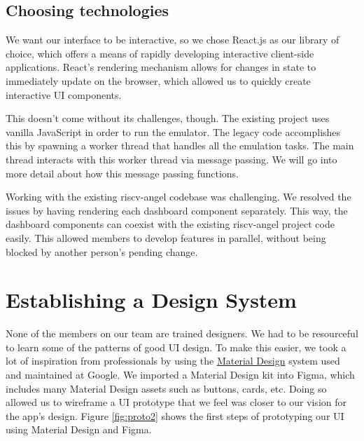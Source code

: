 \subsection*{Choosing technologies}

We want our interface to be interactive, so we chose React.js as our library of choice,
which offers a means of rapidly developing interactive client-side applications. React's
rendering mechanism allows for changes in state to immediately update on the browser,
which allowed us to quickly create interactive UI components.

This doesn't come without its challenges, though. The existing project uses vanilla JavaScript
in order to run the emulator. The legacy code accomplishes this by spawning a worker thread
that handles all the emulation tasks. The main thread interacts with this worker thread via
message passing. We will go into more detail about how this message passing functions.

Working with the existing riscv-angel codebase was challenging. We resolved
the issues by having rendering each dashboard component separately. This way,
the dashboard components can coexist with the existing riscv-angel project code
easily. This allowed members to develop features in parallel, without being blocked
by another person's pending change.


\section{Establishing a Design System}

None of the members on our team are trained designers. We had to be resourceful
to learn some of the patterns of good UI design. To make this easier, we took
a lot of inspiration from professionals by using the \href{https://material.io/design}{Material Design}
system used and maintained at Google. We imported a Material Design kit into Figma,
which includes many Material Design assets such as buttons, cards, etc. Doing so
allowed us to wireframe a UI prototype that we feel was closer to our vision for the app's design.
Figure \ref{fig:proto2} shows the first steps of prototyping our UI using Material Design and Figma.

